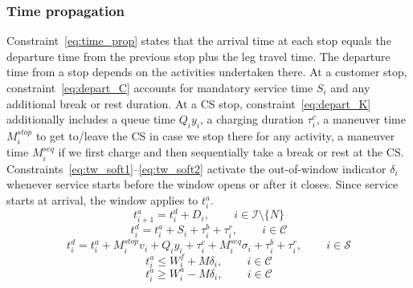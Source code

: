 \subsubsection{Time propagation}
Constraint~\eqref{eq:time_prop} states that the arrival time at each stop equals the departure time from the previous stop plus the leg travel time. The departure time from a stop depends on the activities undertaken there. At a customer stop, constraint~\eqref{eq:depart_C} accounts for mandatory service time $S_i$ and any additional break or rest duration. At a CS stop, constraint~\eqref{eq:depart_K} additionally includes a queue time $Q_i y_i$, a charging duration $\tau_i^c$, a maneuver time $M_i^{stop}$ to get to/leave the CS in case we stop there for any activity, a maneuver time $M_i^{seq}$ if we first charge and then sequentially take a break or rest at the CS. Constraints~\eqref{eq:tw_soft1}--\eqref{eq:tw_soft2} activate the out-of-window indicator $\delta_i$ whenever service starts before the window opens or after it closes. Since service starts at arrival, the window applies to $t_i^a$.
\begin{equation}
    t_{i+1}^a = t_i^d + D_i, \qquad \, i \in \mathcal{I}\setminus\{N\} \label{eq:time_prop}
\end{equation}
\begin{equation}
    t_i^d = t_i^a + S_i + \tau_i^{b} + \tau_i^r, \qquad \, i \in \mathcal{C} \label{eq:depart_C}
\end{equation}
\begin{equation}
    t_i^d = t_i^a +  M_i^{stop} v_i + Q_i y_i + \tau_i^c + M_i^{seq} \sigma_i + \tau_i^{b} + \tau_i^r, \qquad \, i \in \mathcal{S} \label{eq:depart_K}
\end{equation}
\begin{equation}
    t_i^a \leq W_i^{f} + M \delta_i, \qquad \, i \in \mathcal{C} \label{eq:tw_soft1}
\end{equation}
\begin{equation}
    t_i^a \geq W_i^{a} - M \delta_i, \qquad \, i \in \mathcal{C} \label{eq:tw_soft2}
\end{equation}

